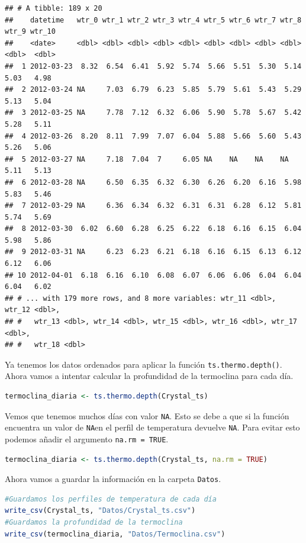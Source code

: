\documentclass[
]{book}
\newcommand{\passthrough}[1]{#1}
\begin{document}
\begin{lstlisting}
## # A tibble: 189 x 20
##    datetime   wtr_0 wtr_1 wtr_2 wtr_3 wtr_4 wtr_5 wtr_6 wtr_7 wtr_8 wtr_9 wtr_10
##    <date>     <dbl> <dbl> <dbl> <dbl> <dbl> <dbl> <dbl> <dbl> <dbl> <dbl>  <dbl>
##  1 2012-03-23  8.32  6.54  6.41  5.92  5.74  5.66  5.51  5.30  5.14  5.03   4.98
##  2 2012-03-24 NA     7.03  6.79  6.23  5.85  5.79  5.61  5.43  5.29  5.13   5.04
##  3 2012-03-25 NA     7.78  7.12  6.32  6.06  5.90  5.78  5.67  5.42  5.28   5.11
##  4 2012-03-26  8.20  8.11  7.99  7.07  6.04  5.88  5.66  5.60  5.43  5.26   5.06
##  5 2012-03-27 NA     7.18  7.04  7     6.05 NA    NA    NA    NA     5.11   5.13
##  6 2012-03-28 NA     6.50  6.35  6.32  6.30  6.26  6.20  6.16  5.98  5.83   5.46
##  7 2012-03-29 NA     6.36  6.34  6.32  6.31  6.31  6.28  6.12  5.81  5.74   5.69
##  8 2012-03-30  6.02  6.60  6.28  6.25  6.22  6.18  6.16  6.15  6.04  5.98   5.86
##  9 2012-03-31 NA     6.23  6.23  6.21  6.18  6.16  6.15  6.13  6.12  6.12   6.06
## 10 2012-04-01  6.18  6.16  6.10  6.08  6.07  6.06  6.06  6.04  6.04  6.04   6.02
## # ... with 179 more rows, and 8 more variables: wtr_11 <dbl>, wtr_12 <dbl>,
## #   wtr_13 <dbl>, wtr_14 <dbl>, wtr_15 <dbl>, wtr_16 <dbl>, wtr_17 <dbl>,
## #   wtr_18 <dbl>
\end{lstlisting}

Ya tenemos los datos ordenados para aplicar la función \passthrough{\lstinline!ts.thermo.depth()!}. Ahora vamos a intentar calcular la profundidad de la termoclina para cada día.

\begin{lstlisting}[language=R]
termoclina_diaria <- ts.thermo.depth(Crystal_ts)
\end{lstlisting}

Vemos que tenemos muchos días con valor \passthrough{\lstinline!NA!}. Esto se debe a que si la función encuentra un valor de \passthrough{\lstinline!NA!}en el perfil de temperatura devuelve \passthrough{\lstinline!NA!}. Para evitar esto podemos añadir el argumento \passthrough{\lstinline!na.rm = TRUE!}.

\begin{lstlisting}[language=R]
termoclina_diaria <- ts.thermo.depth(Crystal_ts, na.rm = TRUE)
\end{lstlisting}

Ahora vamos a guardar la información en la carpeta \passthrough{\lstinline!Datos!}.

\begin{lstlisting}[language=R]
#Guardamos los perfiles de temperatura de cada día
write_csv(Crystal_ts, "Datos/Crystal_ts.csv")
#Guardamos la profundidad de la termoclina
write_csv(termoclina_diaria, "Datos/Termoclina.csv")
\end{lstlisting}
\end{document}

